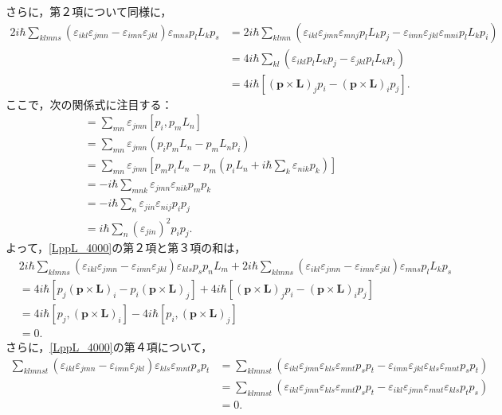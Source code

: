 さらに，第２項について同様に，
\begin{align*}
  2i\hbar\sum_{klmns}(\varepsilon_{ikl}\varepsilon_{jmn} - \varepsilon_{imn}\varepsilon_{jkl})\varepsilon_{mns}p_lL_kp_s
  & = 2i\hbar\sum_{klmn}(\varepsilon_{ikl}\varepsilon_{jmn}\varepsilon_{mnj}p_lL_kp_j - \varepsilon_{imn}\varepsilon_{jkl}\varepsilon_{mni}p_lL_kp_i)\\
  & = 4i\hbar\sum_{kl}(\varepsilon_{ikl}p_lL_kp_j - \varepsilon_{jkl}p_lL_kp_i)\\
  & = 4i\hbar[(\boldsymbol{p}\times\boldsymbol{L})_jp_i - (\boldsymbol{p}\times\boldsymbol{L})_ip_j].
\end{align*}
ここで，次の関係式に注目する：
\begin{align*}
  [p_i,(\boldsymbol{p}\times\boldsymbol{L})_j]
  & = \sum_{mn}\varepsilon_{jmn}[p_i,p_mL_n]\\
  & = \sum_{mn}\varepsilon_{jmn}(p_ip_mL_n - p_mL_np_i)\\
  & = \sum_{mn}\varepsilon_{jmn}\left[p_mp_iL_n - p_m\left(p_iL_n + i\hbar\sum_k\varepsilon_{nik}p_k\right)\right]\\
  & = - i\hbar\sum_{mnk}\varepsilon_{jmn}\varepsilon_{nik}p_mp_k\\
  & = - i\hbar\sum_{n}\varepsilon_{jin}\varepsilon_{nij}p_ip_j\\
  & = i\hbar\sum_n(\varepsilon_{jin})^2p_ip_j.
\end{align*}
よって，\eqref{LppL_4000}の第２項と第３項の和は，
\begin{align*}
  & 2i\hbar\sum_{klmns}(\varepsilon_{ikl}\varepsilon_{jmn} - \varepsilon_{imn}\varepsilon_{jkl})\varepsilon_{kls}p_sp_nL_m + 2i\hbar\sum_{klmns}(\varepsilon_{ikl}\varepsilon_{jmn} - \varepsilon_{imn}\varepsilon_{jkl})\varepsilon_{mns}p_lL_kp_s \\
  & = 4i\hbar[p_j(\boldsymbol{p}\times\boldsymbol{L})_i - p_i(\boldsymbol{p}\times\boldsymbol{L})_j] + 4i\hbar[(\boldsymbol{p}\times\boldsymbol{L})_jp_i - (\boldsymbol{p}\times\boldsymbol{L})_ip_j]\\
  & = 4i\hbar[p_j,(\boldsymbol{p}\times\boldsymbol{L})_i] - 4i\hbar[p_i,(\boldsymbol{p}\times\boldsymbol{L})_j]\\
  & = 0.
\end{align*}
さらに，\eqref{LppL_4000}の第４項について，
\begin{align*}
  \sum_{klmnst}(\varepsilon_{ikl}\varepsilon_{jmn} - \varepsilon_{imn}\varepsilon_{jkl})\varepsilon_{kls}\varepsilon_{mnt}p_sp_t
  & = \sum_{klmnst}(\varepsilon_{ikl}\varepsilon_{jmn}\varepsilon_{kls}\varepsilon_{mnt}p_sp_t - \varepsilon_{imn}\varepsilon_{jkl}\varepsilon_{kls}\varepsilon_{mnt}p_sp_t)\\
  & = \sum_{klmnst}(\varepsilon_{ikl}\varepsilon_{jmn}\varepsilon_{kls}\varepsilon_{mnt}p_sp_t - \varepsilon_{ikl}\varepsilon_{jmn}\varepsilon_{mnt}\varepsilon_{kls}p_tp_s)\\
  & = 0.
\end{align*}
